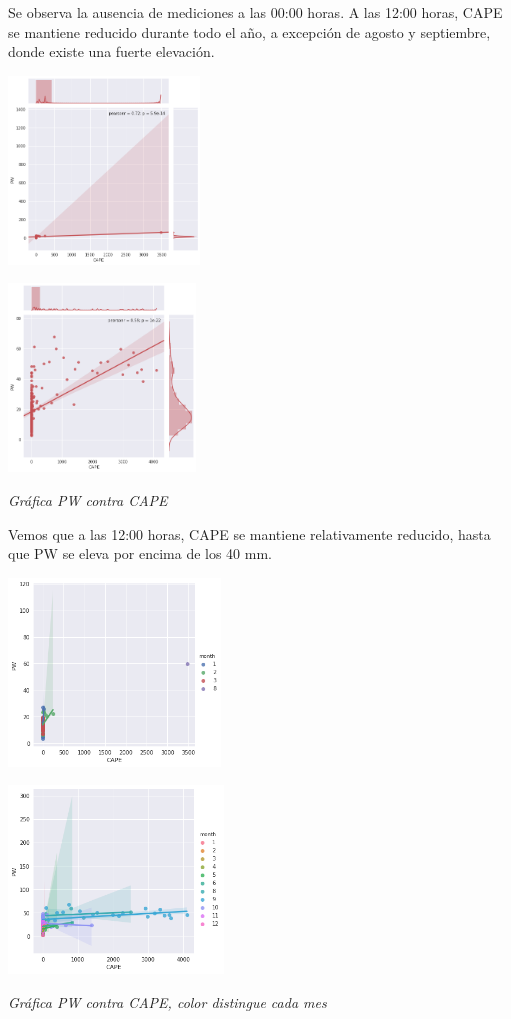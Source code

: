 \documentclass[a4paper]{article}
\begin{document}
Se observa la ausencia de mediciones a las 00:00 horas. A las 12:00 horas, CAPE se mantiene reducido durante todo el año, a excepción de agosto y septiembre, donde existe una fuerte elevación.

\begin{center}
	\includegraphics[height=5cm]{Z002.png}
    
    \includegraphics[height=5cm]{Z122.png}
    
    \textit{Gráfica PW contra CAPE}
\end{center}


Vemos que a las 12:00 horas, CAPE se mantiene relativamente reducido, hasta que PW se eleva por encima de los 40 mm.

\begin{center}
	\includegraphics[height=5cm]{Z003.png}
    
    \includegraphics[height=5cm]{Z123.png}

	\textit{Gráfica PW contra CAPE, color distingue cada mes}
\end{center}
\end{document}
